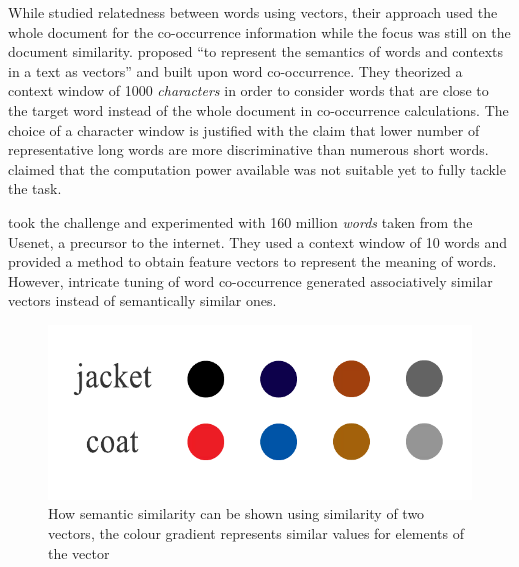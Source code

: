 While \citeauthor{deerwester_indexing_1990} studied relatedness between words using vectors, their approach used the whole document for the co-occurrence information while the focus was still on the document similarity.
\textcite{schutze_dimensions_1992} proposed \enquote{to represent the semantics of words and contexts in a text as vectors} and built upon word co-occurrence.
They theorized a context window of 1000 \emph{characters} in order to consider words that are close to the target word instead of the whole document in co-occurrence calculations.
The choice of a character window is justified with the claim that lower number of representative long words are more discriminative than numerous short words.
\citeauthor{schutze_dimensions_1992} claimed that the computation power available was not suitable yet to fully tackle the task.

\textcite{lund_producing_1996} took the challenge and experimented with 160 million \emph{words} taken from the Usenet, a precursor to the internet.
They used a context window of 10 words and provided a method to obtain feature vectors to represent the meaning of words.
However, intricate tuning of word co-occurrence generated associatively similar vectors instead of semantically similar ones.

\begin{figure}[htbp]
    \centering
    \includegraphics[page=1,width=\textwidth]{Figures/jacket_coat.pdf}
    \caption{How semantic similarity can be shown using similarity of two vectors, the colour gradient represents similar values for elements of the vector}%
    \label{fig:jacket_coat}
\end{figure}

